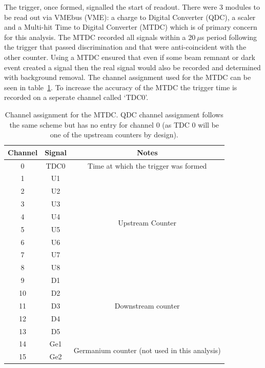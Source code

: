 \documentclass[]{article}
\newcommand{\ms}{$~\mu$s}
\begin{document}
The trigger, once formed, signalled the start of readout. There were 3 modules to be read out via VMEbus (VME): a charge to Digital Converter (QDC), a scaler and a Multi-hit Time to Digital Converter (MTDC) which is of primary concern for this analysis. The MTDC recorded all signals  within a 20\ms{} period following the trigger that passed discrimination and that were anti-coincident with the other counter. Using a MTDC ensured that even if some beam remnant or dark event created a signal then the real signal would also be recorded and determined with background removal. The channel assignment used for the MTDC can be seen in table~\ref{tab:mtdc_ch}. To increase the accuracy of the MTDC the trigger time is recorded on a seperate channel called `TDC0'.
\begin{table}
    \begin{center}
    \begin{tabular}{c|c|c}
        Channel & Signal & Notes\\
        \hline
        0  & TDC0 & Time at which the trigger was formed \\
        \hline
        1  & U1   & \multirow{8}{*}{Upstream Counter}\\
        2  & U2   & \\
        3  & U3   & \\
        4  & U4   & \\
        5  & U5   & \\
        6  & U6   & \\
        7  & U7   & \\
        8  & U8   & \\
        \hline
        9  & D1   & \multirow{5}{*}{Downstream counter}\\
        10 & D2   & \\
        11 & D3   & \\
        12 & D4   & \\
        13 & D5   & \\
        \hline
        14 & Ge1  & \multirow{2}{*}{Germanium counter (not used in this analysis)}\\
        15 & Ge2  & \\
    \end{tabular}
    \end{center}
    \caption{Channel assignment for the MTDC. QDC channel assignment follows the same scheme but has no entry for channel 0 (as TDC 0 will be one of the upstream counters by design).}
    \label{tab:mtdc_ch}
\end{table}
\end{document}
